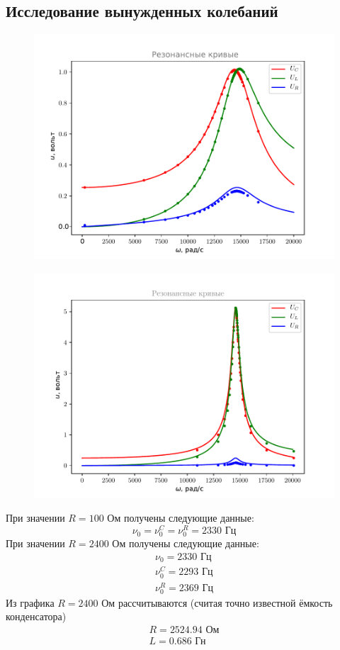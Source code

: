 \subsection{Исследование вынужденных колебаний}
\begin{figure}[H]
	\centering
	\includegraphics[width=0.86\linewidth]{plot/r2400}
	\label{fig:figure3}
\end{figure}
\begin{figure}[H]
	\centering
	\includegraphics[width=0.86\linewidth]{plot/r100}
	\label{fig:figure4}
\end{figure}

При значении $R=100$ Ом получены следующие данные:
\begin{equation}
	\nu_0=\nu_0^C=\nu_0^R=2330 \text{ Гц}
\end{equation}
При значении $R=2400$ Ом получены следующие данные:
\begin{gather}
	\nu_0=2330 \text{ Гц}\\
	\nu_0^C=2293 \text{ Гц}\\
	\nu_0^R=2369 \text{ Гц}
\end{gather}
Из графика $R=2400$ Ом рассчитываются (считая точно известной ёмкость конденсатора)
\begin{gather}
	R=2524.94 \text{ Ом}\\
	L=0.686 \text{ Гн}
\end{gather}

